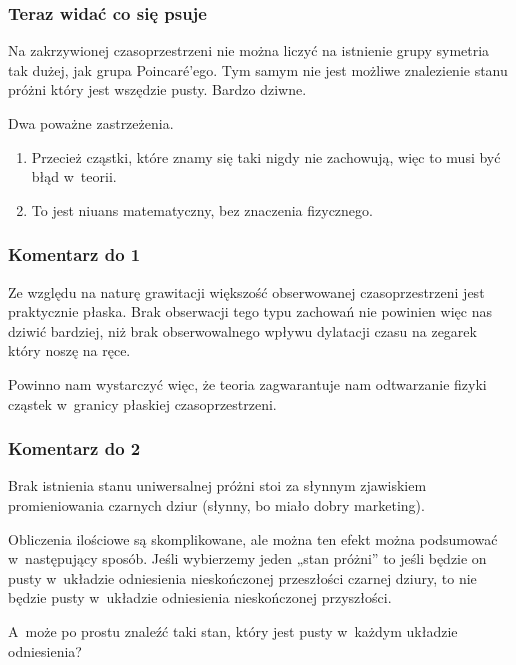 \documentclass[10pt,t]{beamer}
\begin{document}
\begin{frame}
  \frametitle{Teraz widać co się psuje}


  Na zakrzywionej czasoprzestrzeni nie można liczyć na istnienie grupy
  symetria tak dużej, jak grupa Poincar\'{e}’ego. Tym samym nie jest
  możliwe znalezienie stanu próżni który jest wszędzie pusty. Bardzo
  dziwne.

  Dwa poważne zastrzeżenia.
  \begin{enumerate}
    \RaggedRight

  \item Przecież cząstki, które znamy się taki nigdy nie zachowują,
    więc to musi być błąd w~teorii.

  \item To jest niuans matematyczny, bez znaczenia fizycznego.

  \end{enumerate}

\end{frame}





\begin{frame}
  \frametitle{Komentarz do 1}


  Ze względu na naturę grawitacji większość obserwowanej
  czasoprzestrzeni jest praktycznie płaska. Brak obserwacji tego typu
  zachowań nie powinien więc nas dziwić bardziej, niż brak
  obserwowalnego wpływu dylatacji czasu na zegarek który noszę na
  ręce.

  Powinno nam wystarczyć więc, że teoria zagwarantuje nam odtwarzanie
  fizyki cząstek w~granicy płaskiej czasoprzestrzeni.

\end{frame}





\begin{frame}
  \frametitle{Komentarz do 2}


  Brak istnienia stanu uniwersalnej próżni stoi za słynnym zjawiskiem
  promieniowania czarnych dziur (słynny, bo miało dobry marketing).

  Obliczenia ilościowe są skomplikowane, ale można ten efekt można
  podsumować w~następujący sposób. Jeśli wybierzemy jeden „stan
  próżni” to jeśli będzie on pusty w~układzie odniesienia
  nieskończonej przeszłości czarnej dziury, to nie będzie pusty
  w~układzie odniesienia nieskończonej przyszłości.

  A~może po prostu znaleźć taki stan, który jest pusty w~każdym
  układzie odniesienia?

\end{frame}
\end{document}
